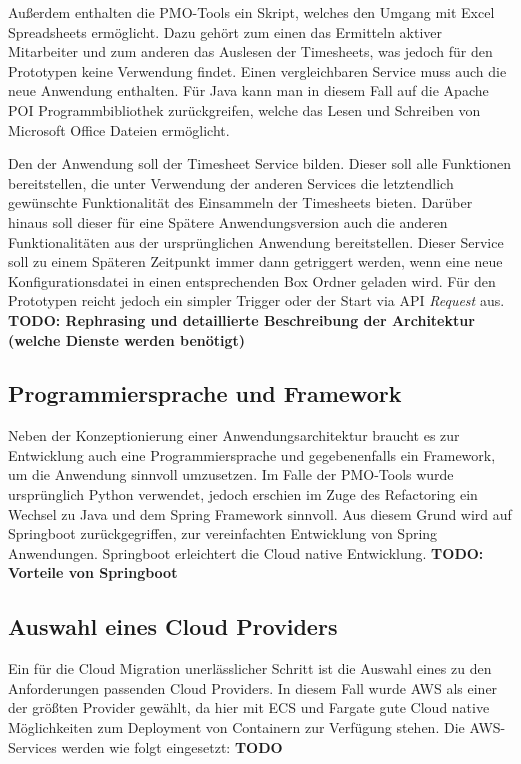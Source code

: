 Außerdem enthalten die PMO-Tools ein \grqq{} Skript, welches den Umgang mit Excel Spreadsheets ermöglicht. Dazu gehört zum einen das Ermitteln aktiver Mitarbeiter und zum anderen das Auslesen der Timesheets, was jedoch für den Prototypen keine Verwendung findet. Einen vergleichbaren Service muss auch die neue Anwendung enthalten. Für Java kann man in diesem Fall auf die Apache POI Programmbibliothek zurückgreifen, welche das Lesen und Schreiben von Microsoft Office Dateien ermöglicht.

Den \grqq{} der Anwendung soll der Timesheet Service bilden. Dieser soll alle Funktionen bereitstellen, die unter Verwendung der anderen Services die letztendlich gewünschte Funktionalität des Einsammeln der Timesheets bieten. Darüber hinaus soll dieser für eine Spätere Anwendungsversion auch die anderen Funktionalitäten aus der ursprünglichen Anwendung bereitstellen. Dieser Service soll zu einem Späteren Zeitpunkt immer dann getriggert werden, wenn eine neue Konfigurationsdatei in einen entsprechenden Box Ordner geladen wird. Für den Prototypen reicht jedoch ein simpler Trigger oder der Start via \ac{API} \textit{Request} aus. \textbf{TODO: Rephrasing und detaillierte Beschreibung der Architektur (welche Dienste werden benötigt)}\pagebreak

\subsection{Programmiersprache und Framework}
Neben der Konzeptionierung einer Anwendungsarchitektur braucht es zur Entwicklung auch eine Programmiersprache und gegebenenfalls ein Framework, um die Anwendung sinnvoll umzusetzen. Im Falle der PMO-Tools wurde ursprünglich Python verwendet, jedoch erschien im Zuge des Refactoring ein Wechsel zu Java und dem \gls{Spring} Framework sinnvoll. Aus diesem Grund wird auf \gls{Springboot} zurückgegriffen, zur vereinfachten Entwicklung von \gls{Spring} Anwendungen. \gls{Springboot} erleichtert die Cloud native Entwicklung. \textbf{TODO: Vorteile von Springboot}

\subsection{Auswahl eines Cloud Providers}
Ein für die Cloud Migration unerlässlicher Schritt ist die Auswahl eines zu den Anforderungen passenden Cloud Providers. In diesem Fall wurde \ac{AWS} als einer der größten Provider gewählt, da hier mit \ac{ECS} und Fargate gute Cloud native Möglichkeiten zum Deployment von Containern zur Verfügung stehen. Die \ac{AWS}-Services werden wie folgt eingesetzt: \textbf{TODO}


